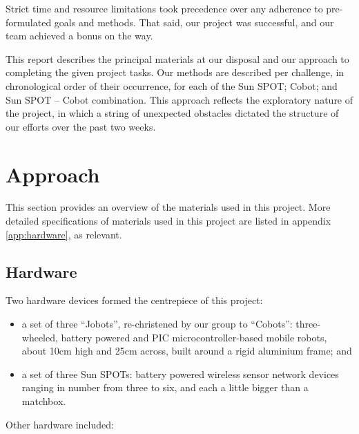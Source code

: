 \documentclass[a4paper,10pt]{article} %
\begin{document}
Strict time and resource limitations took precedence over any adherence
to pre-formulated goals and methods. That said, our project was successful,
and our team achieved a bonus on the way.

This report describes the principal materials at our disposal and our approach
to completing the given project tasks. Our methods are described per challenge,
in chronological order of their occurrence, for each of the Sun SPOT; Cobot; and
Sun SPOT -- Cobot combination. This approach reflects the exploratory nature of
the project, in which a string of unexpected obstacles dictated the structure of
our efforts over the past two weeks.


%
%
%
%

\pagebreak

\section{Approach} %

This section provides an overview of the materials used in this project. More
detailed specifications of materials used in this project are listed in appendix
\ref{app:hardware}, as relevant.

\subsection{Hardware} %

Two hardware devices formed the centrepiece of this project:

\begin{itemize}
    \item a set of three ``Jobots'', re-christened by our group to
    ``Cobots'': three-wheeled, battery powered and PIC microcontroller-based mobile
    robots, about 10cm high and 25cm across, built around a rigid aluminium frame;
    and
    \item a set of three Sun SPOTs: battery powered wireless sensor network
    devices ranging in number from three to six, and each a little bigger than a
    matchbox.
\end{itemize}

Other hardware included:
\end{document}
